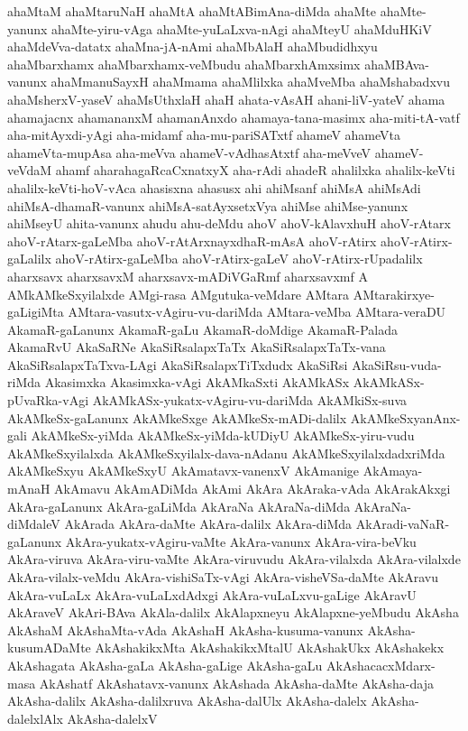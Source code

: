 {ahaMtaM
ahaMtaruNaH
ahaMtA
ahaMtABimAna-diMda
ahaMte
ahaMte-yanunx
ahaMte-yiru-vAga
ahaMte-yuLaLxva-nAgi
ahaMteyU
ahaMduHKiV
ahaMdeVva-datatx
ahaMna-jA-nAmi
ahaMbAlaH
ahaMbudidhxyu
ahaMbarxhamx
ahaMbarxhamx-veMbudu
ahaMbarxhAmxsimx
ahaMBAva-vanunx
ahaMmanuSayxH
ahaMmama
ahaMlilxka
ahaMveMba
ahaMshabadxvu
ahaMsherxV-yaseV
ahaMsUthxlaH
ahaH
ahata-vAsAH
ahani-liV-yateV
ahama
ahamajacnx
ahamananxM
ahamanAnxdo
ahamaya-tana-masimx
aha-miti-tA-vatf
aha-mitAyxdi-yAgi
aha-midamf
aha-mu-pariSATxtf
ahameV
ahameVta
ahameVta-mupAsa
aha-meVva
ahameV-vAdhasAtxtf
aha-meVveV
ahameV-veVdaM
ahamf
aharahagaRcaCxnatxyX
aha-rAdi
ahadeR
ahalilxka
ahalilx-keVti
ahalilx-keVti-hoV-vAca
ahasisxna
ahasusx
ahi
ahiMsanf
ahiMsA
ahiMsAdi
ahiMsA-dhamaR-vanunx
ahiMsA-satAyxsetxVya
ahiMse
ahiMse-yanunx
ahiMseyU
ahita-vanunx
ahudu
ahu-deMdu
ahoV
ahoV-kAlavxhuH
ahoV-rAtarx
ahoV-rAtarx-gaLeMba
ahoV-rAtArxnayxdhaR-mAsA
ahoV-rAtirx
ahoV-rAtirx-gaLalilx
ahoV-rAtirx-gaLeMba
ahoV-rAtirx-gaLeV
ahoV-rAtirx-rUpadalilx
aharxsavx
aharxsavxM
aharxsavx-mADiVGaRmf
aharxsavxmf
A
AMkAMkeSxyilalxde
AMgi-rasa
AMgutuka-veMdare
AMtara
AMtarakirxye-gaLigiMta
AMtara-vasutx-vAgiru-vu-dariMda
AMtara-veMba
AMtara-veraDU
AkamaR-gaLanunx
AkamaR-gaLu
AkamaR-doMdige
AkamaR-Palada
AkamaRvU
AkaSaRNe
AkaSiRsalapxTaTx
AkaSiRsalapxTaTx-vana
AkaSiRsalapxTaTxva-LAgi
AkaSiRsalapxTiTxdudx
AkaSiRsi
AkaSiRsu-vuda-riMda
Akasimxka
Akasimxka-vAgi
AkAMkaSxti
AkAMkASx
AkAMkASx-pUvaRka-vAgi
AkAMkASx-yukatx-vAgiru-vu-dariMda
AkAMkiSx-suva
AkAMkeSx-gaLanunx
AkAMkeSxge
AkAMkeSx-mADi-dalilx
AkAMkeSxyanAnx-gali
AkAMkeSx-yiMda
AkAMkeSx-yiMda-kUDiyU
AkAMkeSx-yiru-vudu
AkAMkeSxyilalxda
AkAMkeSxyilalx-dava-nAdanu
AkAMkeSxyilalxdadxriMda
AkAMkeSxyu
AkAMkeSxyU
AkAmatavx-vanenxV
AkAmanige
AkAmaya-mAnaH
AkAmavu
AkAmADiMda
AkAmi
AkAra
AkAraka-vAda
AkArakAkxgi
AkAra-gaLanunx
AkAra-gaLiMda
AkAraNa
AkAraNa-diMda
AkAraNa-diMdaleV
AkArada
AkAra-daMte
AkAra-dalilx
AkAra-diMda
AkAradi-vaNaR-gaLanunx
AkAra-yukatx-vAgiru-vaMte
AkAra-vanunx
AkAra-vira-beVku
AkAra-viruva
AkAra-viru-vaMte
AkAra-viruvudu
AkAra-vilalxda
AkAra-vilalxde
AkAra-vilalx-veMdu
AkAra-vishiSaTx-vAgi
AkAra-visheVSa-daMte
AkAravu
AkAra-vuLaLx
AkAra-vuLaLxdAdxgi
AkAra-vuLaLxvu-gaLige
AkAravU
AkAraveV
AkAri-BAva
AkAla-dalilx
AkAlapxneyu
AkAlapxne-yeMbudu
AkAsha
AkAshaM
AkAshaMta-vAda
AkAshaH
AkAsha-kusuma-vanunx
AkAsha-kusumADaMte
AkAshakikxMta
AkAshakikxMtalU
AkAshakUkx
AkAshakekx
AkAshagata
AkAsha-gaLa
AkAsha-gaLige
AkAsha-gaLu
AkAshacacxMdarx-masa
AkAshatf
AkAshatavx-vanunx
AkAshada
AkAsha-daMte
AkAsha-daja
AkAsha-dalilx
AkAsha-dalilxruva
AkAsha-dalUlx
AkAsha-dalelx
AkAsha-dalelxlAlx
AkAsha-dalelxV
}
